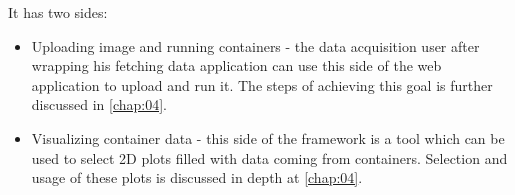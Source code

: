 It has two sides:
\begin{itemize}
	\item Uploading image and running containers - the data acquisition user after wrapping his fetching data application can use this side of the web application to upload and run it. The steps of achieving this goal is further discussed in \autoref{chap:04}.
	\item Visualizing container data - this side of the framework is a tool which can be used to select 2D plots filled with data coming from containers. Selection and usage of these plots is discussed in depth at \autoref{chap:04}.
\end{itemize}

